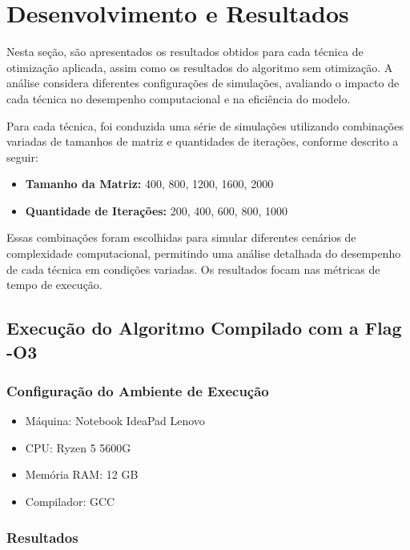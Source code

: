 \section{Desenvolvimento e Resultados}

Nesta seção, são apresentados os resultados obtidos para cada técnica de otimização aplicada, assim como os resultados do algoritmo sem otimização. A análise considera diferentes configurações de simulações, avaliando o impacto de cada técnica no desempenho computacional e na eficiência do modelo.

Para cada técnica, foi conduzida uma série de simulações utilizando combinações variadas de tamanhos de matriz e quantidades de iterações, conforme descrito a seguir:

\begin{itemize}
    \item \textbf{Tamanho da Matriz:} 400, 800, 1200, 1600, 2000
    \item \textbf{Quantidade de Iterações:} 200, 400, 600, 800, 1000
\end{itemize}

Essas combinações foram escolhidas para simular diferentes cenários de complexidade computacional, permitindo uma análise detalhada do desempenho de cada técnica em condições variadas. Os resultados focam nas métricas de tempo de execução.

\subsection{Execução do Algoritmo Compilado com a Flag -O3}
\subsubsection{Configuração do Ambiente de Execução}
\begin{itemize}
    \item Máquina: Notebook IdeaPad Lenovo
    \item CPU: Ryzen 5 5600G
    \item Memória RAM: 12 GB
    \item Compilador: GCC
\end{itemize}

\subsubsection{Resultados}

